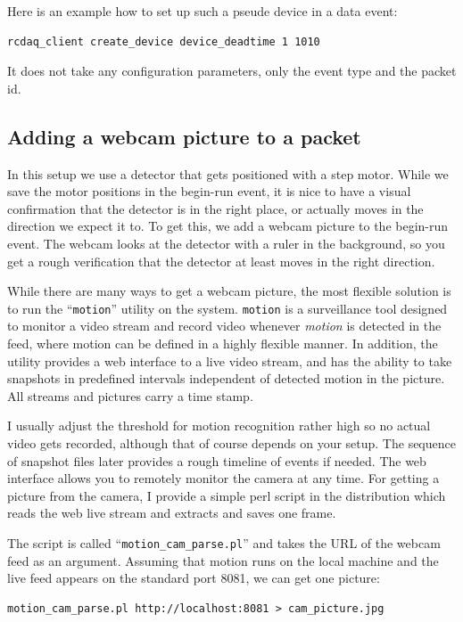 \documentclass{article}[11pt]
\begin{document}
Here is an example how to set up such a pseude device in a data event:

\begin{verbatim}
rcdaq_client create_device device_deadtime 1 1010
\end{verbatim}

It does not take any configuration parameters, only the event type and
the packet id.

\subsection{Adding a webcam picture to a packet}

In this setup we use a detector that gets positioned with a step
motor. While we save the motor positions in the begin-run event, it is
nice to have a visual confirmation that the detector is in the right
place, or actually moves in the direction we expect it to. To get
this, we add a webcam picture to the begin-run event. The webcam looks
at the detector with a ruler in the background, so you get a rough
verification that the detector at least moves in the right direction.

While there are many ways to get a webcam picture, the most flexible
solution is to run the ``\verb|motion|'' utility on the
system. \verb|motion| is a surveillance tool designed to monitor a
video stream and record video whenever \emph{motion} is detected in
the feed, where motion can be defined in a highly flexible manner. In
addition, the utility provides a web interface to a live video stream,
and has the ability to take snapshots in predefined intervals
independent of detected motion in the picture. All streams and
pictures carry a time stamp.

I usually adjust the threshold for motion recognition rather high so
no actual video gets recorded, although that of course depends on your
setup. The sequence of snapshot files later provides a rough
timeline of events if needed. The web interface allows you to remotely
monitor the camera at any time. For getting a picture from the camera,
I provide a simple perl script in the distribution which reads the web
live stream and extracts and saves one frame.

The script is called ``\verb|motion_cam_parse.pl|'' and takes the URL
of the webcam feed as an argument. Assuming that motion runs on the
local machine and the live feed appears on the standard port 8081, we can
get one picture:

\begin{verbatim}
motion_cam_parse.pl http://localhost:8081 > cam_picture.jpg
\end{verbatim}
\end{document}
